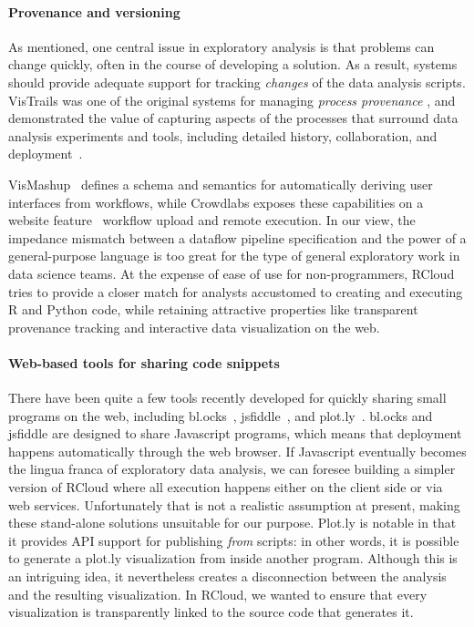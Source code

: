 \paragraph*{Provenance and versioning} As
mentioned, one central issue in exploratory analysis is that
problems can change quickly, often in the course of developing a
solution. As a result, systems should provide adequate support for
tracking \emph{changes} of the data analysis scripts. VisTrails was
one of the original systems for managing \emph{process provenance} ,
and demonstrated the value of capturing aspects of the processes that
surround data analysis experiments and tools, including detailed
history, collaboration, and deployment~\cite{Callahan:2006:VVM}.

VisMashup~\cite{Santos:2009:VST} defines a schema and
semantics for automatically deriving user interfaces from workflows,
while Crowdlabs exposes these capabilities on a website
feature~\cite{Mates:2011:CSA} workflow upload and remote execution. In
our view, the impedance mismatch between a dataflow pipeline
specification and the power of a general-purpose language is too great
for the type of general exploratory work in data science teams. At the
expense of ease of use for non-programmers, RCloud tries to provide a
closer match for analysts accustomed to creating and executing R and
Python code, while retaining attractive properties like transparent
provenance tracking and interactive data visualization on the web.

\paragraph*{Web-based tools for sharing code snippets}
There have been quite a few tools recently developed for quickly
sharing small programs on the web, including
bl.ocks~\cite{blocks}, jsfiddle~\cite{jsfiddle}, and
plot.ly~\cite{plotly}. bl.ocks and jsfiddle are designed to
share Javascript programs, which means that deployment happens
automatically through the web browser. If Javascript eventually becomes
the lingua franca of exploratory data analysis, we can foresee
building a simpler version of RCloud where all execution happens
either on the client side or via web services. Unfortunately that is
not a realistic assumption at present, making these stand-alone
solutions unsuitable for our purpose. Plot.ly is notable in that it
provides API support for publishing \emph{from} scripts: in other
words, it is possible to generate a plot.ly visualization from inside
another program. Although this is an intriguing idea, it
nevertheless creates a disconnection between the analysis and the
resulting visualization. In RCloud, we wanted to ensure that every
visualization is transparently linked to the source code that
generates it.

